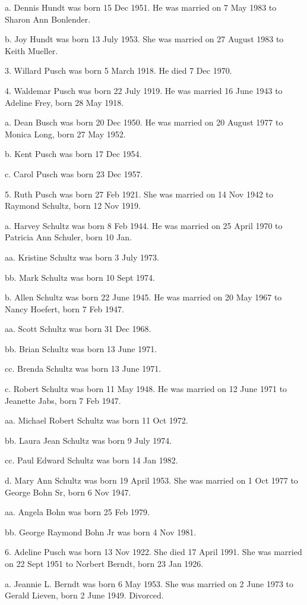 \documentclass[a4paper]{article}
\begin{document}
a. Dennis Hundt was born 15 Dec 1951.  He was married on 7 May 1983 to Sharon Ann Bonlender.

b. Joy Hundt was born 13 July 1953.  She was married on 27 August 1983 to Keith Mueller.

3. Willard Pusch was born 5 March 1918.  He died 7 Dec 1970.  

4. Waldemar Pusch was born 22 July 1919.  He was married 16 June 1943 to Adeline Frey, born 28 May 1918.

a. Dean Busch was born 20 Dec 1950.  He was married on 20 August 1977 to Monica Long, born 27 May 1952. 

b. Kent Pusch was born 17 Dec 1954.

c. Carol Pusch was born 23 Dec 1957.

5. Ruth Pusch was born 27 Feb 1921.  She was married on 14 Nov 1942 to Raymond Schultz, born 12 Nov 1919.

a. Harvey Schultz was born 8 Feb 1944.  He was married on 25 April 1970  to Patricia Ann Schuler, born 10 Jan.

aa. Kristine Schultz was born 3 July 1973.  

bb. Mark Schultz was born 10 Sept 1974.

b. Allen Schultz was born 22 June 1945.  He was married on 20 May  1967 to Nancy Hoefert, born 7 Feb 1947.

aa. Scott Schultz was born 31 Dec 1968.

bb. Brian Schultz was born 13 June 1971.

cc. Brenda Schultz was born 13 June 1971.

c. Robert Schultz was born 11 May 1948.  He was married on 12 June 1971 to Jeanette Jabs, born 7 Feb 1947.  

aa. Michael Robert Schultz was born 11 Oct 1972.

bb. Laura Jean Schultz was born 9 July 1974.

cc. Paul Edward Schultz was born 14 Jan 1982.

d. Mary Ann Schultz was born 19 April 1953.  She was married on 1 Oct 1977 to George Bohn Sr, born 6 Nov 1947.

aa. Angela Bohn was born 25 Feb 1979.

bb. George Raymond Bohn Jr was born 4 Nov 1981.

6. Adeline Pusch was born 13 Nov 1922.  She died 17 April 1991.  She was married on 22 Sept 1951 to Norbert Berndt, born 23 Jan 1926.

a. Jeannie L. Berndt was born 6 May 1953.  She was married on 2 June 1973 to Gerald Lieven, born 2 June 1949.  Divorced.
\end{document}
